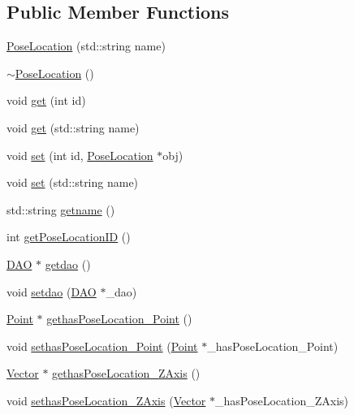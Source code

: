 \subsection*{Public Member Functions}
\begin{DoxyCompactItemize}
\item 
\hyperlink{class_pose_location_a24c90cf3f66dc10cc415fa833ce9501c}{PoseLocation} (std::string name)
\item 
\hyperlink{class_pose_location_a992dedaf11796dc00b0703dd04f6eacd}{$\sim$PoseLocation} ()
\item 
void \hyperlink{class_pose_location_a8b05ffe2202af40a22e7dcd4a7a0bec3}{get} (int id)
\item 
void \hyperlink{class_pose_location_ac80d95846f773d86e3d6cfc97bed779c}{get} (std::string name)
\item 
void \hyperlink{class_pose_location_a6a7bc564a0976e606691c973127cbb43}{set} (int id, \hyperlink{class_pose_location}{PoseLocation} $\ast$obj)
\item 
void \hyperlink{class_pose_location_abf15870fff773935c4ab02f01cd47eac}{set} (std::string name)
\item 
std::string \hyperlink{class_pose_location_aaa31295a8214a697e4daa577f687f2f4}{getname} ()
\item 
int \hyperlink{class_pose_location_a72535774ad78bbd575911394e1b417a0}{getPoseLocationID} ()
\item 
\hyperlink{class_d_a_o}{DAO} $\ast$ \hyperlink{class_pose_location_a53b620b3918557714158a297bc90b257}{getdao} ()
\item 
void \hyperlink{class_pose_location_a86c7f6e2a4610954bc530864d6d8ec52}{setdao} (\hyperlink{class_d_a_o}{DAO} $\ast$\_\-dao)
\item 
\hyperlink{class_point}{Point} $\ast$ \hyperlink{class_pose_location_af57be83c9fcbb9c47958235c30e940ab}{gethasPoseLocation\_\-Point} ()
\item 
void \hyperlink{class_pose_location_aec1f49d2e6ad45782ff8c92c4843b34e}{sethasPoseLocation\_\-Point} (\hyperlink{class_point}{Point} $\ast$\_\-hasPoseLocation\_\-Point)
\item 
\hyperlink{class_vector}{Vector} $\ast$ \hyperlink{class_pose_location_a9c11d9cac1eb4acf192dcdc517064f19}{gethasPoseLocation\_\-ZAxis} ()
\item 
void \hyperlink{class_pose_location_a18cb9a7bc0d87675e7b6c30d34c8f1d4}{sethasPoseLocation\_\-ZAxis} (\hyperlink{class_vector}{Vector} $\ast$\_\-hasPoseLocation\_\-ZAxis)
\item 

\end{DoxyCompactItemize}
